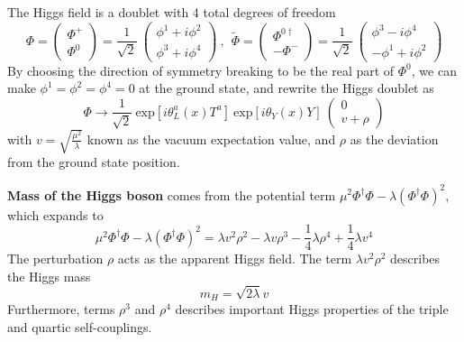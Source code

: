 The Higgs field is a doublet with 4 total degrees of freedom
\begin{equation}\label{eq:SU2_higgs}
    \Phi = \begin{pmatrix} \Phi^{+} \\ \Phi^{0} \end{pmatrix} 
         = \frac{1}{\sqrt{2}} ~ \begin{pmatrix} \phi^{1}+i\phi^{2} \\ \phi^{3}+i\phi^{4} \end{pmatrix}
    ~,~~
    \tilde{\Phi} = \begin{pmatrix} \Phi^{0\dagger} \\ -\Phi^{-} \end{pmatrix} 
                 = \frac{1}{\sqrt{2}} ~ \begin{pmatrix} \phi^{3}-i\phi^{4} \\ -\phi^{1}+i\phi^{2} \end{pmatrix}     
\end{equation}
By choosing the direction of symmetry breaking to be the real part of $\Phi^{0}$, 
we can make $\phi^{1} = \phi^{2} = \phi^{4} = 0$ at the ground state,
and rewrite the Higgs doublet as
\begin{equation}\label{eq:Higgs_ground}
    \Phi \to \frac{1}{\sqrt{2}} ~\text{exp}[i\theta^{a}_{L}(x)T^{a}] ~\text{exp}[i\theta_{Y}(x)Y] ~\begin{pmatrix} 0 \\ v + \rho \end{pmatrix}
\end{equation} 
with $v = \sqrt{\frac{\mu^{2}}{\lambda}}$ known as the vacuum expectation value,
and $\rho$ as the deviation from the ground state position.


\textbf{Mass of the Higgs boson} comes from the potential term $\mu^{2} \Phi^{\dagger}\Phi - \lambda (\Phi^{\dagger}\Phi)^{2}$,
which expands to 
\begin{equation}\label{eq:potential_expand}
  \mu^{2} \Phi^{\dagger}\Phi - \lambda (\Phi^{\dagger}\Phi)^{2}
  = \lambda v^{2} \rho^{2} - \lambda v \rho^{3} - \frac{1}{4} \lambda \rho^{4} + \frac{1}{4} \lambda v^{4}
\end{equation}
The perturbation $\rho$ acts as the apparent Higgs field.
The term $\lambda v^{2} \rho^{2}$ describes the Higgs mass
\begin{equation}\label{eq:Higgs_mass}
    m_{H} = \sqrt{2\lambda} v
\end{equation}
Furthermore, terms $\rho^{3}$ and $\rho^{4}$ describes important Higgs properties of the triple and quartic self-couplings.

